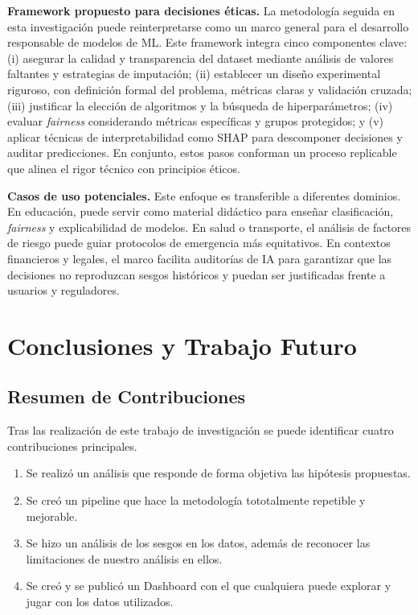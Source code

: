 \documentclass[conference]{IEEEtran}
\begin{document}
\textbf{Framework propuesto para decisiones éticas.}  
La metodología seguida en esta investigación puede reinterpretarse como un marco general para el desarrollo responsable de modelos de ML. Este framework integra cinco componentes clave: (i) asegurar la calidad y transparencia del dataset mediante análisis de valores faltantes y estrategias de imputación; (ii) establecer un diseño experimental riguroso, con definición formal del problema, métricas claras y validación cruzada; (iii) justificar la elección de algoritmos y la búsqueda de hiperparámetros; (iv) evaluar \textit{fairness} considerando métricas específicas y grupos protegidos; y (v) aplicar técnicas de interpretabilidad como SHAP para descomponer decisiones y auditar predicciones. En conjunto, estos pasos conforman un proceso replicable que alinea el rigor técnico con principios éticos.  

\textbf{Casos de uso potenciales.}  
Este enfoque es transferible a diferentes dominios. En educación, puede servir como material didáctico para enseñar clasificación, \textit{fairness} y explicabilidad de modelos. En salud o transporte, el análisis de factores de riesgo puede guiar protocolos de emergencia más equitativos. En contextos financieros y legales, el marco facilita auditorías de IA para garantizar que las decisiones no reproduzcan sesgos históricos y puedan ser justificadas frente a usuarios y reguladores.

\section{Conclusiones y Trabajo Futuro}
\subsection{Resumen de Contribuciones}
Tras las realización de este trabajo de investigación se puede identificar cuatro contribuciones principales.
\begin{enumerate}
\item Se realizó un análisis que responde de forma objetiva las hipótesis propuestas.
\item Se creó un pipeline que hace la metodología tototalmente repetible y mejorable.
\item Se hizo un análisis de los sesgos en los datos, además de reconocer las limitaciones de nuestro análisis en ellos.
\item Se creó y se publicó un Dashboard con el que cualquiera puede explorar y jugar con los datos utilizados.
\end{enumerate}
\end{document}
